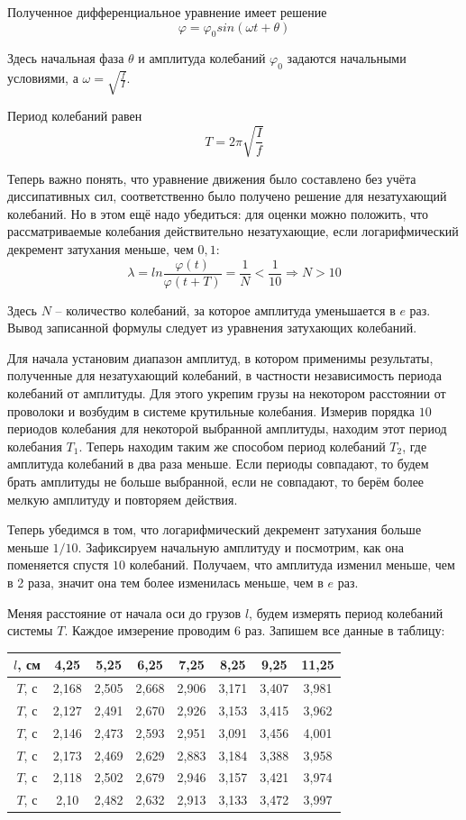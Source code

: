 \documentclass[a4paper, 12pt]{article} %
\begin{document}
Полученное дифференциальное уравнение имеет решение
\[\varphi = \varphi_0 sin(\omega t + \theta)\]

Здесь начальная фаза $\theta$ и амплитуда колебаний $\varphi_0$ задаются начальными условиями, а $\omega = \sqrt{\frac{f}{I}}$.

Период колебаний равен 
\[T = 2 \pi \sqrt{\frac{I}{f}} \]

Теперь важно понять, что уравнение движения было составлено без учёта диссипативных сил, соответственно было получено решение для незатухающий колебаний. Но в этом ещё надо убедиться: для оценки можно положить, что рассматриваемые колебания действительно незатухающие, если логарифмический декремент затухания меньше, чем $0,1$:
\[\lambda = ln\frac{\varphi (t)}{\varphi (t + T)} = \frac{1}{N} < \frac{1}{10} \Rightarrow N > 10\]

Здесь $N$ -- количество колебаний, за которое амплитуда уменьшается в $e$ раз. Вывод записанной формулы следует из уравнения затухающих колебаний.

Для начала установим диапазон амплитуд, в котором применимы результаты, полученные для незатухающий колебаний, в частности независимость периода колебаний от амплитуды. Для этого укрепим грузы на некотором расстоянии от проволоки и возбудим в системе крутильные колебания. Измерив порядка $10$ периодов колебания для некоторой выбранной амплитуды, находим этот период колебания $T_1$. Теперь находим таким же способом период колебаний $T_2$, где амплитуда колебаний в два раза меньше. Если периоды совпадают, то будем брать амплитуды не больше выбранной, если не совпадают, то берём более мелкую амплитуду и повторяем действия.  

Теперь убедимся в том, что логарифмический декремент затухания больше меньше $1/10$. Зафиксируем начальную амплитуду и посмотрим, как она поменяется спустя $10$ колебаний. Получаем, что амплитуда изменил меньше, чем в 2 раза, значит она тем более изменилась меньше, чем в $e$ раз.

Меняя расстояние от начала оси до грузов $l$, будем измерять период колебаний системы $T$. Каждое имзерение проводим $6$ раз. Запишем все данные в таблицу:

\begin{center}
\begin{tabular}{|c|c|c|c|c|c|c|c|}
\hline 
$l$, см & 4,25 & 5,25 & 6,25 & 7,25 & 8,25 & 9,25 & 11,25 \\ 
\hline 
$T$, с & 2,168 & 2,505 & 2,668 & 2,906 & 3,171 & 3,407 & 3,981 \\ 
\hline 
$T$, с & 2,127 & 2,491 & 2,670 & 2,926 & 3,153 & 3,415 & 3,962 \\ 
\hline 
$T$, с & 2,146 & 2,473 & 2,593 & 2,951 & 3,091 & 3,456 & 4,001 \\ 
\hline 
$T$, с & 2,173 & 2,469 & 2,629 & 2,883 & 3,184 & 3,388 & 3,958 \\ 
\hline 
$T$, с & 2,118 & 2,502 & 2,679 & 2,946 & 3,157 & 3,421 & 3,974 \\ 
\hline 
$T$, с & 2,10 & 2,482 & 2,632 & 2,913 & 3,133 & 3,472 & 3,997 \\ 
\hline 
\end{tabular}
\end{center} 
\end{document}
